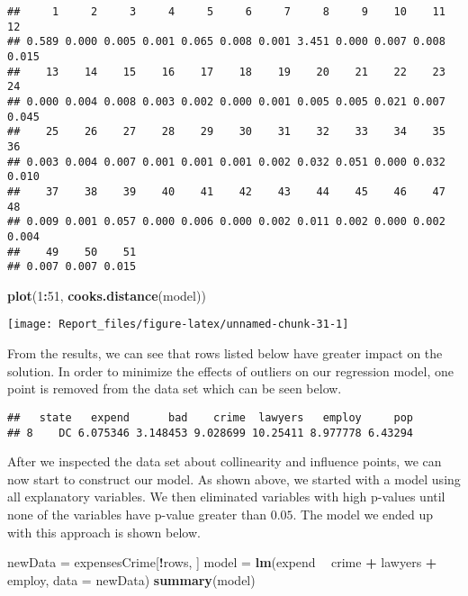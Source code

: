 \documentclass[]{article}
\newenvironment{Shaded}{\begin{snugshade}}{\end{snugshade}}
\newcommand{\KeywordTok}[1]{\textcolor[rgb]{0.13,0.29,0.53}{\textbf{#1}}}
\newcommand{\DataTypeTok}[1]{\textcolor[rgb]{0.13,0.29,0.53}{#1}}
\newcommand{\DecValTok}[1]{\textcolor[rgb]{0.00,0.00,0.81}{#1}}
\newcommand{\StringTok}[1]{\textcolor[rgb]{0.31,0.60,0.02}{#1}}
\newcommand{\OperatorTok}[1]{\textcolor[rgb]{0.81,0.36,0.00}{\textbf{#1}}}
\newcommand{\NormalTok}[1]{#1}
\begin{document}
\begin{verbatim}
##     1     2     3     4     5     6     7     8     9    10    11    12 
## 0.589 0.000 0.005 0.001 0.065 0.008 0.001 3.451 0.000 0.007 0.008 0.015 
##    13    14    15    16    17    18    19    20    21    22    23    24 
## 0.000 0.004 0.008 0.003 0.002 0.000 0.001 0.005 0.005 0.021 0.007 0.045 
##    25    26    27    28    29    30    31    32    33    34    35    36 
## 0.003 0.004 0.007 0.001 0.001 0.001 0.002 0.032 0.051 0.000 0.032 0.010 
##    37    38    39    40    41    42    43    44    45    46    47    48 
## 0.009 0.001 0.057 0.000 0.006 0.000 0.002 0.011 0.002 0.000 0.002 0.004 
##    49    50    51 
## 0.007 0.007 0.015
\end{verbatim}

\begin{Shaded}
\begin{Highlighting}[]
\KeywordTok{plot}\NormalTok{(}\DecValTok{1}\OperatorTok{:}\DecValTok{51}\NormalTok{, }\KeywordTok{cooks.distance}\NormalTok{(model))}
\end{Highlighting}
\end{Shaded}

\begin{center}\texttt{[image: Report\_files/figure-latex/unnamed-chunk-31-1]} \end{center}

From the results, we can see that rows listed below have greater impact
on the solution. In order to minimize the effects of outliers on our
regression model, one point is removed from the data set which can be
seen below.

\begin{verbatim}
##   state   expend      bad    crime  lawyers   employ     pop
## 8    DC 6.075346 3.148453 9.028699 10.25411 8.977778 6.43294
\end{verbatim}

After we inspected the data set about collinearity and influence points,
we can now start to construct our model. As shown above, we started with
a model using all explanatory variables. We then eliminated variables
with high p-values until none of the variables have p-value greater than
\(0.05\). The model we ended up with this approach is shown below.

\begin{Shaded}
\begin{Highlighting}[]
\NormalTok{newData =}\StringTok{ }\NormalTok{expensesCrime[}\OperatorTok{!}\NormalTok{rows, ]}
\NormalTok{model =}\StringTok{ }\KeywordTok{lm}\NormalTok{(expend }\OperatorTok{~}\StringTok{ }\NormalTok{crime }\OperatorTok{+}\StringTok{ }\NormalTok{lawyers }\OperatorTok{+}\StringTok{ }\NormalTok{employ, }\DataTypeTok{data =}\NormalTok{ newData)}
\KeywordTok{summary}\NormalTok{(model)}
\end{Highlighting}
\end{Shaded}
\end{document}

